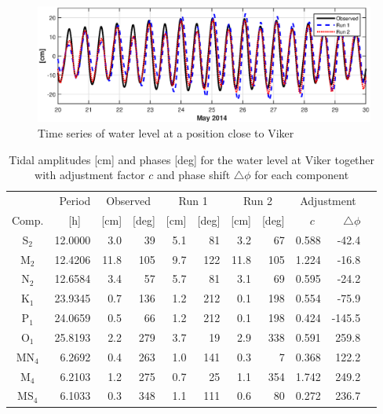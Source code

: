 \begin{figure}[!t]
\centering
\includegraphics[width=\textwidth]{fig_Viker_timeseries}
\caption{Time series of water level at a position close to Viker}
\label{fig:Viker_timeseries}
\end{figure}



\begin{table}[ht]
\caption{Tidal amplitudes [cm] and phases [deg] for the water level at Viker together with adjustment factor $c$ and phase shift $\triangle \phi$ for each component}
\label{tab:Viker}
\centering
\begin{tabular}{crrrrrrrrrr} \hline
       & Period & \multicolumn{2}{c}{Observed} & \multicolumn{2}{c}{Run 1} & \multicolumn{2}{c}{Run 2} & \multicolumn{2}{c}{Adjustment} \\
Comp.  & [h] $\;\;$ & [cm] & [deg] & [cm] & [deg] & [cm] & [deg] & $c\;\;$ & $\triangle \phi$  \\ \hline 
S$_2$  &  12.0000 &   3.0 &  39 &    5.1 &  81 &    3.2 &  67 &    0.588 &   -42.4   \\
M$_2$  &  12.4206 &  11.8 & 105 &    9.7 & 122 &   11.8 & 105 &    1.224 &   -16.8   \\
N$_2$  &  12.6584 &   3.4 &  57 &    5.7 &  81 &    3.1 &  69 &    0.595 &   -24.2   \\
K$_1$  &  23.9345 &   0.7 & 136 &    1.2 & 212 &    0.1 & 198 &    0.554 &   -75.9   \\
P$_1$  &  24.0659 &   0.5 &  66 &    1.2 & 212 &    0.1 & 198 &    0.424 &  -145.5   \\
O$_1$  &  25.8193 &   2.2 & 279 &    3.7 &  19 &    2.9 & 338 &    0.591 &   259.8   \\
MN$_4$ &   6.2692 &   0.4 & 263 &    1.0 & 141 &    0.3 &   7 &    0.368 &   122.2   \\
M$_4$  &   6.2103 &   1.2 & 275 &    0.7 &  25 &    1.1 & 354 &    1.742 &   249.2   \\
MS$_4$ &   6.1033 &   0.3 & 348 &    1.1 & 111 &    0.6 &  80 &    0.272 &   236.7   \\ \hline
\end{tabular}
\end{table}


